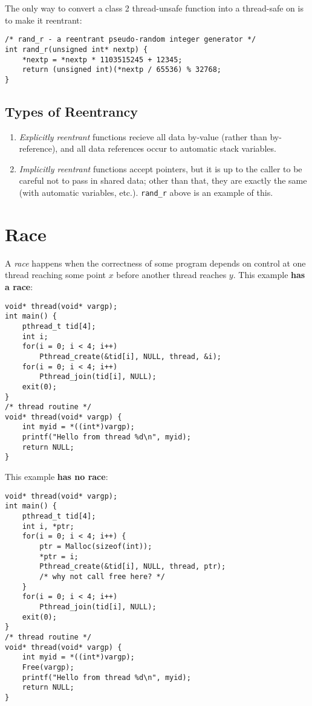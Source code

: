 \documentclass[fleqn]{article}
\begin{document}
The only way to convert a class 2 thread-unsafe function into a thread-safe on is to make it reentrant:

\begin{verbatim}
/* rand_r - a reentrant pseudo-random integer generator */
int rand_r(unsigned int* nextp) {
    *nextp = *nextp * 1103515245 + 12345;
    return (unsigned int)(*nextp / 65536) % 32768;
}
\end{verbatim}

\subsection{Types of Reentrancy}

\begin{enumerate}
\item \textit{Explicitly reentrant} functions recieve all data by-value (rather than by-reference), and all data references occur to automatic stack variables.

\item \textit{Implicitly reentrant} functions accept pointers, but it is up to the caller to be careful not to pass in shared data; other than that, they are exactly the same (with automatic variables, etc.). \texttt{rand\_r} above is an example of this.
\end{enumerate}

\section{Race}

A \textit{race} happens when the correctness of some program depends on control at one thread reaching some point $x$ before another thread reaches $y$. This example \textbf{has a race}:

\begin{verbatim}
void* thread(void* vargp);
int main() {
    pthread_t tid[4];
    int i;
    for(i = 0; i < 4; i++) 
        Pthread_create(&tid[i], NULL, thread, &i);
    for(i = 0; i < 4; i++) 
        Pthread_join(tid[i], NULL);
    exit(0);
}
/* thread routine */
void* thread(void* vargp) {
    int myid = *((int*)vargp);
    printf("Hello from thread %d\n", myid);
    return NULL;
}
\end{verbatim}

This example \textbf{has no race}:

\begin{verbatim}
void* thread(void* vargp);
int main() {
    pthread_t tid[4];
    int i, *ptr;
    for(i = 0; i < 4; i++) {
        ptr = Malloc(sizeof(int));
        *ptr = i;
        Pthread_create(&tid[i], NULL, thread, ptr);  
        /* why not call free here? */
    }
    for(i = 0; i < 4; i++) 
        Pthread_join(tid[i], NULL);
    exit(0);
}
/* thread routine */
void* thread(void* vargp) {
    int myid = *((int*)vargp);
    Free(vargp); 
    printf("Hello from thread %d\n", myid);
    return NULL;
}
\end{verbatim}
\end{document}
